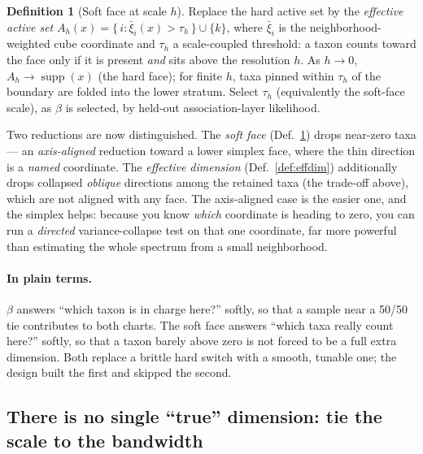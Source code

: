 \documentclass[11pt]{article}
\theoremstyle{definition}
\newtheorem{definition}{Definition}[section]
\theoremstyle{plain}
\theoremstyle{remark}
\newcommand{\supp}{\operatorname{supp}}
\newcommand{\1}{\mathbf{1}}
\begin{document}
\begin{definition}[Soft face at scale $h$]\label{def:softface}
Replace the hard active set by the \emph{effective active set}
$A_h(x)=\{\,i:\bar\xi_i(x)>\tau_h\,\}\cup\{k\}$, where $\bar\xi_i$ is the
neighborhood-weighted cube coordinate and $\tau_h$ a scale-coupled threshold: a
taxon counts toward the face only if it is present \emph{and} sits above the
resolution $h$. As $h\to0$, $A_h\to\supp(x)$ (the hard face); for finite $h$,
taxa pinned within $\tau_h$ of the boundary are folded into the lower stratum.
Select $\tau_h$ (equivalently the soft-face scale), as $\beta$ is selected, by
held-out association-layer likelihood.
\end{definition}

Two reductions are now distinguished. The \emph{soft face} (Def.~\ref{def:softface})
drops near-zero taxa --- an \emph{axis-aligned} reduction toward a lower simplex
face, where the thin direction is a \emph{named} coordinate. The \emph{effective
dimension} (Def.~\ref{def:effdim}) additionally drops collapsed \emph{oblique}
directions among the retained taxa (the trade-off above), which are not aligned
with any face. The axis-aligned case is the easier one, and the simplex helps:
because you know \emph{which} coordinate is heading to zero, you can run a
\emph{directed} variance-collapse test on that one coordinate, far more powerful
than estimating the whole spectrum from a small neighborhood.

\paragraph{In plain terms.}
$\beta$ answers ``which taxon is in charge here?'' softly, so that a sample near a
50/50 tie contributes to both charts. The soft face answers ``which taxa really
count here?'' softly, so that a taxon barely above zero is not forced to be a full
extra dimension. Both replace a brittle hard switch with a smooth, tunable one;
the design built the first and skipped the second.

\subsection{There is no single ``true'' dimension: tie the scale to the bandwidth}
\label{sec:scale}
\end{document}
